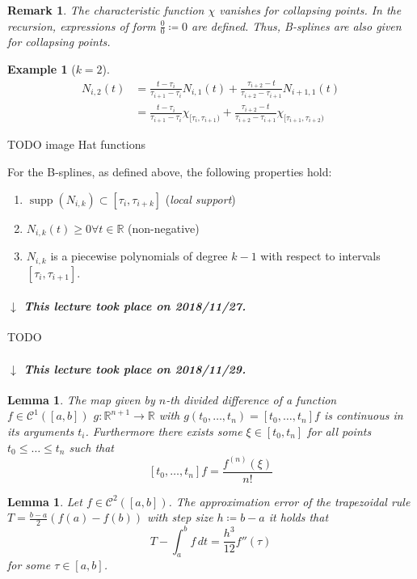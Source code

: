 \documentclass[a4paper]{article}
\newcounter{lecref}[section]
\numberwithin{lecref}{section}
\theoremstyle{break}
\newtheorem{example}[lecref]{Example}
\newtheorem{lemma}[lecref]{Lemma}
\newtheorem*{Remark}{Remark}
\newcommand{\dateref}[1]{%
  \begin{mdframed}[backgroundcolor=gray!10,innerbottommargin=0pt,innertopmargin=0pt]
    \paragraph{\textit{$\downarrow$ This lecture took place on #1.}}%
  \end{mdframed}%
}
\begin{document}
\begin{Remark}
  The characteristic function $\chi$ vanishes for collapsing points.
  In the recursion, expressions of form $\frac00 \coloneqq 0$ are defined.
  Thus, B-splines are also given for collapsing points.
\end{Remark}

\begin{example}[$k=2$]
  \begin{align*}
    N_{i,2}(t) &= \frac{t - \tau_i}{\tau_{i+1} - \tau_i} N_{i,1}(t) + \frac{\tau_{i+2} - t}{\tau_{i+2} - \tau_{i+1}} N_{i+1,1}(t) \\
      &= \frac{t - \tau_i}{\tau_{i+1} - \tau_i} \chi_{[\tau_i,\tau_{i+1})} + \frac{\tau_{i+2} - t}{\tau_{i+2} - \tau_{i+1}} \chi_{[\tau_{i+1},\tau_{i+2})}
  \end{align*}
\end{example}

TODO image Hat functions

For the B-splines, as defined above, the following properties hold:
\begin{enumerate}
  \item $\operatorname{supp}(N_{i,k}) \subset [\tau_i, \tau_{i+k}]$ (\emph{local support})
  \item $N_{i,k}(t) \geq 0 \forall t \in \mathbb R$ (non-negative)
  \item $N_{i,k}$ is a piecewise polynomials of degree $k-1$ with respect to intervals $[\tau_i, \tau_{i+1}]$.
\end{enumerate}

\dateref{2018/11/27}

TODO

\dateref{2018/11/29}

\begin{lemma}
  \label{lemma:5-6}
  The map given by $n$-th divided difference of a function $f \in \mathcal C^1([a, b])$ $g: \mathbb R^{n + 1} \to \mathbb R$ with $g(t_0, \dots, t_n) = [t_0, \dots, t_n] f$ is continuous in its arguments $t_i$. Furthermore there exists some $\xi \in [t_0, t_n]$ for all points $t_0 \leq \dots \leq t_n$ such that
  \[ [t_0, \dots, t_n] f = \frac{f^{(n)}(\xi)}{n!} \]
\end{lemma}

\begin{lemma}
  \label{lemma:5-7}
  Let $f \in \mathcal C^2([a,b])$. The approximation error of the trapezoidal rule $T = \frac{b - a}{2} (f(a) - f(b))$ with step size $h \coloneqq b - a$ it holds that
  \[ T - \int_a^b f \, dt = \frac{h^3}{12} f''(\tau) \]
  for some $\tau \in [a,b]$.
\end{lemma}
\end{document}
